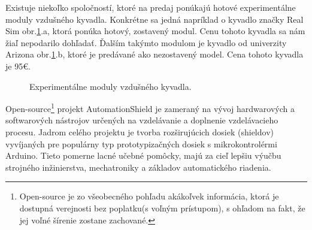 Existuje niekoľko spoločností, ktoré na predaj ponúkajú hotové experimentálne moduly vzdušného kyvadla. Konkrétne sa jedná napríklad o kyvadlo značky Real Sim obr.\ref{OBRAZOK 1.2}.a, ktorá ponúka hotový, zostavený modul. Cenu tohoto kyvadla sa nám žiaľ nepodarilo dohľadať. Ďalším takýmto modulom je kyvadlo od univerzity Arizona\cite{enikov_campa_2012} obr.\ref{OBRAZOK 1.2}.b, ktoré je predávané ako nezostavený model. Cena tohoto kyvadla je 95\euro. 

\begin{figure}[!tbh]
	\hfill
	\hfill
	\hfill
	\caption{Experimentálne moduly vzdušného kyvadla.}\label{OBRAZOK 1.2}
\end{figure}

\newpage
Open-source\footnote[1]{Open-source je zo všeobecného pohľadu akákoľvek informácia, ktorá je dostupná verejnosti bez poplatku(s voľným prístupom), s ohľadom na fakt, že jej voľné šírenie zostane zachované.} projekt AutomationShield je zameraný na vývoj hardwarových a softwarových nástrojov určených na vzdelávanie a doplnenie vzdelávacieho procesu. Jadrom celého projektu je tvorba rozširujúcich dosiek (shieldov) vyvíjaných pre populárny typ prototypizačných dosiek s mikrokontrolérmi Arduino. Tieto pomerne lacné učebné pomôcky, majú za cieľ lepšiu výučbu strojného inžinierstva, mechatroniky a základov automatického riadenia\cite{Auto}.

